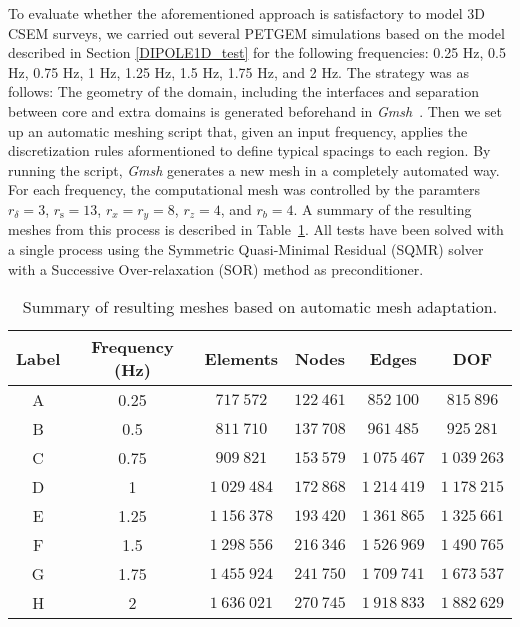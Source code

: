 \documentclass[review]{elsarticle}
\begin{document}
To evaluate whether the aforementioned approach is satisfactory to model 3D CSEM surveys, we carried out several PETGEM  simulations based on the model described in Section \ref{DIPOLE1D_test} for the following frequencies: 0.25 Hz,  0.5 Hz, 0.75 Hz, 1 Hz, 1.25 Hz, 1.5 Hz, 1.75 Hz, and 2 Hz. The strategy was as follows: The geometry of the domain, including the interfaces and separation between core and extra domains is generated beforehand in \textit{Gmsh}~\citep{Geuzaine2008}. Then we set up an automatic meshing script that, given an input frequency, applies the discretization rules aformentioned to define typical spacings to each region. By running the script, \textit{Gmsh} generates a new mesh in a completely automated way. For each frequency, the computational mesh was controlled by the paramters $r_{\delta} = 3$, $r_{\text{s}} = 13$, $r_{x} = r_{y} = 8$, $r_{z} = 4$, and $r_{b} = 4$. A summary of the resulting meshes from this process is described in Table~\ref{table:meshes_automatic_adaptation}. All tests have been solved with a single process using the Symmetric Quasi-Minimal Residual (SQMR) solver with a Successive Over-relaxation (SOR) method as preconditioner.
\begin{table}[!htbp]
\centering
\caption{Summary of resulting meshes based on automatic mesh adaptation.}
\small
\begin{tabular}{cccccc}
\toprule
Label   & Frequency (Hz) & Elements & Nodes & Edges & DOF \\
\midrule
A & 0.25 & $717\:572$ & $122\:461$ & $852\:100$ & $815\:896$ \\ %
B & 0.5  & $811\:710$ & $137\:708$ & $961\:485$ & $925\:281$ \\ %
C & 0.75 & $909\:821$ & $153\:579$ & $1\:075\:467$ & $1\:039\:263$ \\ %
D & 1    & $1\:029\:484$ & $172\:868$ & $1\:214\:419$ & $1\:178\:215$ \\ %
E & 1.25 & $1\:156\:378$ & $193\:420$ & $1\:361\:865$ & $1\:325\:661$ \\ %
F & 1.5  & $1\:298\:556$ & $216\:346$ & $1\:526\:969$ & $1\:490\:765$ \\ %
G & 1.75 & $1\:455\:924$ & $241\:750$ & $1\:709\:741$ & $1\:673\:537$ \\ %
H & 2    & $1\:636\:021$ & $270\:745$ & $1\:918\:833$ & $1\:882\:629$ \\ %
\bottomrule
\end{tabular}
\label{table:meshes_automatic_adaptation}
\end{table}
\end{document}
